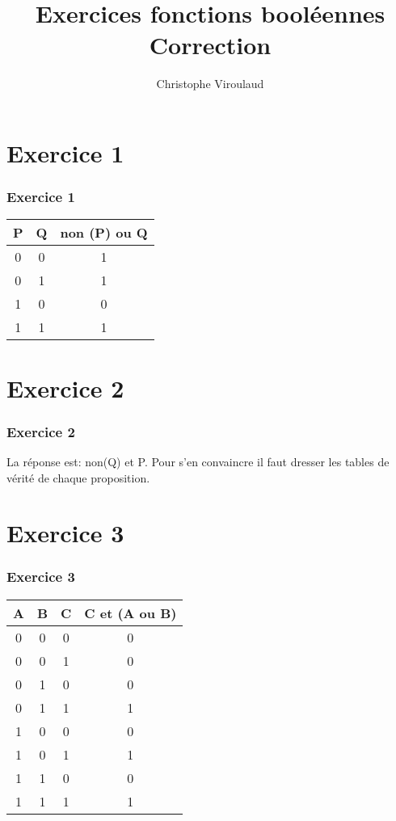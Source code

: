 \documentclass[svgnames,11pt]{beamer}
\author[]{Christophe Viroulaud}
\title{Exercices fonctions booléennes\\Correction}
\date{\framebox{\textbf{ArchMat 07}}}
\institute{Première - NSI}
\begin{document}
\begin{frame}
    \titlepage
\end{frame}
\section{Exercice 1}
\begin{frame}
    \frametitle{Exercice 1}

    \begin{center}
        \begin{tabular}{|c|c|c|}
            \hline
            P & Q & non (P) ou Q \\
            \hline
            0 & 0 & 1            \\
            \hline
            0 & 1 & 1            \\
            \hline
            1 & 0 & 0            \\
            \hline
            1 & 1 & 1            \\
            \hline
        \end{tabular}
    \end{center}

\end{frame}
\section{Exercice 2}
\begin{frame}
    \frametitle{Exercice 2}

    La réponse est: non(Q) et P. Pour s'en convaincre il faut dresser les tables de vérité de chaque proposition.


\end{frame}
\section{Exercice 3}
\begin{frame}
    \frametitle{Exercice 3}

    \begin{center}
        \begin{tabular}{|*4{c|}}
            \hline
            A & B & C & C et (A ou B) \\
            \hline
            0 & 0 & 0 & 0             \\
            \hline
            0 & 0 & 1 & 0             \\
            \hline
            0 & 1 & 0 & 0             \\
            \hline
            0 & 1 & 1 & 1             \\
            \hline
            1 & 0 & 0 & 0             \\
            \hline
            1 & 0 & 1 & 1             \\
            \hline
            1 & 1 & 0 & 0             \\
            \hline
            1 & 1 & 1 & 1             \\
            \hline
        \end{tabular}
    \end{center}

\end{frame}
\end{document}

